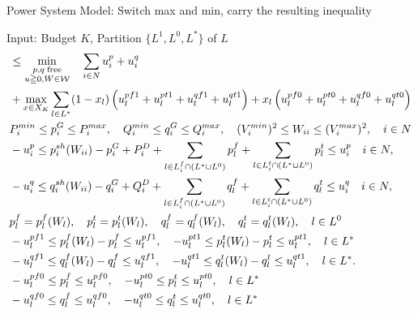 \documentclass[xcolor=dvipsnames]{beamer}
\newcommand{\p}[1]{p^{#1}}
\newcommand{\q}[1]{q^{#1}}
\newcommand{\ii}{i}
\newcommand{\llll}{l}
\newcommand{\from}{f}
\newcommand{\tto}{t}
\newcommand{\WW}{W}
\newcommand{\WSet}{\mathcal{W}}
\newcommand{\Lines}{L}
\begin{document}
\begin{frame}{Power System Model: Switch max and min, carry the resulting inequality}
\begin{footnotesize}
Input: Budget $K$, Partition $\{ L^1,L^0,L^* \}$ of $L$
\begin{subequations}
\begin{align}
 & \le \min_{\substack{p,q\;\text{free}\\ u \geqq 0,W\in \WSet}} \quad 
 \sum_{i \in N} u_i^p + u_i^q  \notag\\
& + \max_{x \in X_K}\sum_{l \in L^*} (1-x_l)\left( u_l^{pf1} + u_l^{pt1} + u_l^{qf1} + u_l^{qt1} \right) 
+ x_l\left( u_l^{pf0} + u_l^{pt0} + u_l^{qf0} + u_l^{qt0} \right)  \notag \\
  & P_i^{min} \leq p_i^G \leq P_i^{max}, \quad Q_i^{min} \leq q_i^G \leq Q_i^{max}, \quad (V_i^{min})^2 \leq W_{ii} \leq (V_i^{max})^2,\quad i\in N \notag \\
  & -u_i^p \le p_i^{sh}(\WW_{ii}) - p^G_i + P^D_i 
	+ \sum_{\llll \in \Lines_\ii^{\from} \cap (L^* \cup L^0)  } p_{l}^{f}  
	+\sum_{\llll \in \Lines_\ii^{\tto} \cap (L^* \cup L^0) } p_{l}^{t} 
	\le u_i^p \quad i\in N, \notag\\ 
  & -u_i^q \le q_i^{sh}(\WW_{ii}) - q^G_i + Q^D_i 
	+ \sum_{\llll \in \Lines_\ii^{\from} \cap (L^* \cup L^0) } q_{l}^{f}
	+ \sum_{\llll \in \Lines_\ii^{\tto} \cap (L^* \cup L^0) } q_{l}^{t} 
	\le u_i^q \quad i\in N, \notag \\
& p_{l}^{f}=\p{\from}_{\llll}(\WW_\llll),\quad p_l^t=\p{\tto}_{\llll}(\WW_\llll),\quad q_l^f=\q{\from}_{\llll}(\WW_\llll),\quad q_l^t=\q{\tto}_{\llll}(\WW_\llll) , \quad \llll \in L^0 \notag \\
& -u_l^{pf1} \le \p{\from}_{\llll}(\WW_\llll) - p_{l}^{f} \le u_l^{pf1}, \quad
 -u_l^{pt1} \le \p{\tto}_{\llll}(\WW_\llll)  - p_{l}^{t} \le u_l^{pt1}, \quad \llll \in L^* \notag \\
& -u_l^{qf1} \le \q{\from}_{\llll}(\WW_\llll) - q_{l}^{f} \le u_l^{qf1}, \quad 
 -u_l^{qt1} \le \q{\tto}_{\llll}(\WW_\llll)  - q_{l}^{t} \le u_l^{qt1}, \quad \llll \in L^*. \notag \\
& -u_l^{pf0} \le p_l^f \le u_l^{pf0},\quad-u_l^{pt0} \le p_l^t \le u_l^{pt0}, \quad l \in L^* \notag\\ 
& -u_l^{qf0} \le q_l^f \le u_l^{qf0},\quad-u_l^{qt0} \le q_l^t \le u_l^{qt0}, \quad l \in L^* \notag
\end{align}
\end{subequations}
\end{footnotesize}
\end{frame}
\end{document}
